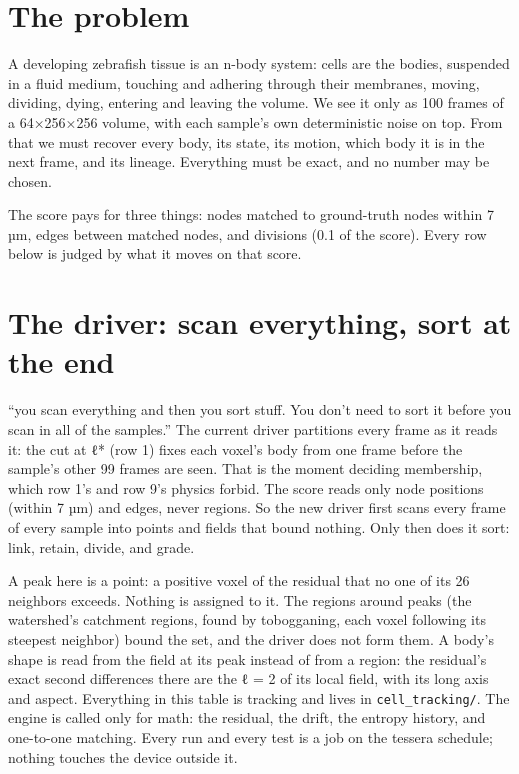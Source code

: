 \section{\texorpdfstring{The problem}{The problem}}

A developing zebrafish tissue is an n-body system: cells are the bodies, suspended in a fluid medium, touching and adhering through their membranes, moving, dividing, dying, entering and leaving the volume. We see it only as 100 frames of a 64×256×256 volume, with each sample's own deterministic noise on top. From that we must recover every body, its state, its motion, which body it is in the next frame, and its lineage. Everything must be exact, and no number may be chosen.

The score pays for three things: nodes matched to ground-truth nodes within 7 µm, edges between matched nodes, and divisions (0.1 of the score). Every row below is judged by what it moves on that score.

\section{\texorpdfstring{The driver: scan everything, sort at the end}{The driver: scan everything, sort at the end}}

“you scan everything and then you sort stuff. You don't need to sort it before you scan in all of the samples.” The current driver partitions every frame as it reads it: the cut at ℓ* (row 1) fixes each voxel's body from one frame before the sample's other 99 frames are seen. That is the moment deciding membership, which row 1's and row 9's physics forbid. The score reads only node positions (within 7 µm) and edges, never regions. So the new driver first scans every frame of every sample into points and fields that bound nothing. Only then does it sort: link, retain, divide, and grade.

A peak here is a point: a positive voxel of the residual that no one of its 26 neighbors exceeds. Nothing is assigned to it. The regions around peaks (the watershed's catchment regions, found by tobogganing, each voxel following its steepest neighbor) bound the set, and the driver does not form them. A body's shape is read from the field at its peak instead of from a region: the residual's exact second differences there are the ℓ = 2 of its local field, with its long axis and aspect. Everything in this table is tracking and lives in \texttt{cell\_\allowbreak{}tracking/\allowbreak{}}. The engine is called only for math: the residual, the drift, the entropy history, and one-to-one matching. Every run and every test is a job on the tessera schedule; nothing touches the device outside it.

